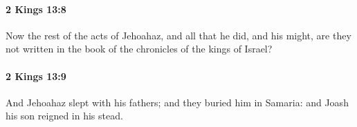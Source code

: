 		\paragraph{2 Kings 13:8} %
			\label{2KINGS-13-8}

			Now the rest of the acts of Jehoahaz, and all that he did, and his might, are they not written in the book of the chronicles of the kings of Israel?


		\paragraph{2 Kings 13:9} %
			\label{2KINGS-13-9}

			And Jehoahaz slept with his fathers; and they buried him in Samaria: and Joash his son reigned in his stead.


